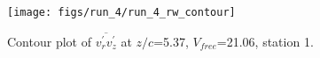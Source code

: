 \begin{figure}[H]
\centering
\texttt{[image: figs/run\_4/run\_4\_rw\_contour]}
\caption{Contour plot of $\overline{v_{r}^{\prime} v_{z}^{\prime}}$ at $z/c$=5.37, $V_{free}$=21.06, station 1.}
\label{fig:run_4_rw_contour}
\end{figure}



